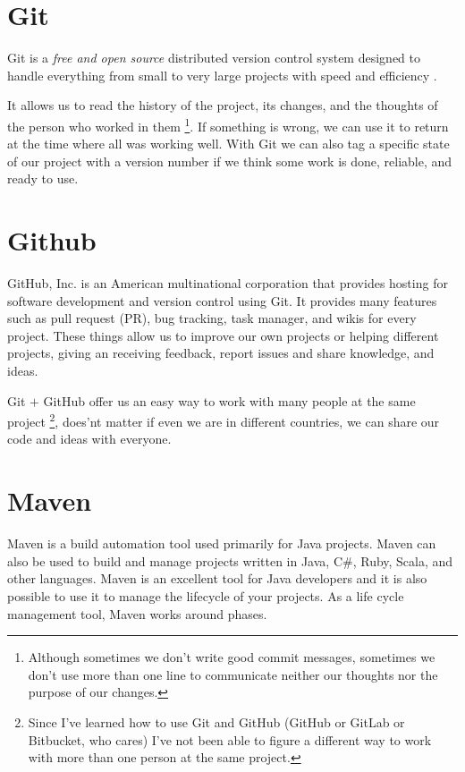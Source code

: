 \documentclass[a4paper,11pt]{article}
\author{Cristian Camilo Serna Betancur \\\\ Andres Grisales}
\begin{document}

\section{Git}
Git is a \emph{free and open source} distributed version control system designed 
to handle everything from small to very large projects with speed and efficiency
\cite{git}. 

It allows us to read the history of the project, its changes, and the thoughts 
of the person who worked in them \footnote{Although sometimes we don't write 
good commit messages, sometimes we don't use more than one line to communicate 
neither our thoughts nor the purpose of our changes.}. If something is wrong, 
we can use it to return at the time where all was working well. With Git we can 
also tag a specific state of our project with a version number if we think some 
work is done, reliable, and ready to use.

\section{Github}
GitHub, Inc. is an American multinational corporation that provides hosting for 
software development and version control using Git\cite{github}. It provides 
many features such as pull request (PR), bug tracking, task manager, and wikis 
for every project. These things allow us to improve our own projects or helping 
different projects, giving an receiving feedback, report issues and share 
knowledge, and ideas.

Git $+$ GitHub offer us an easy way to work with many people at the same project
\footnote{Since I've learned how to use Git and GitHub (GitHub or GitLab or 
Bitbucket, who cares) I've not been able to figure a different way to work with 
more than one person at the same project.}, does'nt matter if even we are in 
different countries, we can share our code and ideas with everyone.


\section{Maven}
Maven is a build automation tool used primarily for Java projects. Maven can also
be used to build and manage projects written in Java, C#, Ruby, Scala, and other 
languages\cite{Maven}. Maven is an excellent tool for Java developers and it is
also possible to use it to manage the lifecycle of your projects. As a life cycle 
management tool, Maven works around phases.
\end{document}

